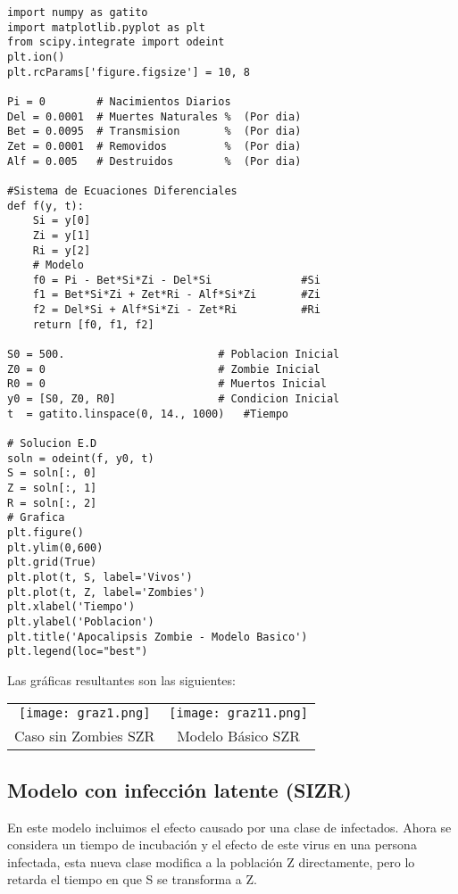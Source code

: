 \documentclass[12pt,letterpaper]{article}
\begin{document}
\begin{verbatim}
import numpy as gatito
import matplotlib.pyplot as plt
from scipy.integrate import odeint
plt.ion()
plt.rcParams['figure.figsize'] = 10, 8

Pi = 0        # Nacimientos Diarios
Del = 0.0001  # Muertes Naturales %  (Por dia)
Bet = 0.0095  # Transmision       %  (Por dia)
Zet = 0.0001  # Removidos         %  (Por dia)
Alf = 0.005   # Destruidos        %  (Por dia)

#Sistema de Ecuaciones Diferenciales 
def f(y, t):
    Si = y[0]
    Zi = y[1]
    Ri = y[2]
    # Modelo 
    f0 = Pi - Bet*Si*Zi - Del*Si              #Si
    f1 = Bet*Si*Zi + Zet*Ri - Alf*Si*Zi       #Zi 
    f2 = Del*Si + Alf*Si*Zi - Zet*Ri          #Ri
    return [f0, f1, f2]

S0 = 500.                        # Poblacion Inicial
Z0 = 0                           # Zombie Inicial
R0 = 0                           # Muertos Inicial
y0 = [S0, Z0, R0]                # Condicion Inicial
t  = gatito.linspace(0, 14., 1000)   #Tiempo

# Solucion E.D
soln = odeint(f, y0, t)
S = soln[:, 0]
Z = soln[:, 1]
R = soln[:, 2]
# Grafica
plt.figure()
plt.ylim(0,600)
plt.grid(True)
plt.plot(t, S, label='Vivos')
plt.plot(t, Z, label='Zombies')
plt.xlabel('Tiempo')
plt.ylabel('Poblacion')
plt.title('Apocalipsis Zombie - Modelo Basico')
plt.legend(loc="best")
\end{verbatim}

Las gr\'aficas resultantes son las siguientes:

\begin{center}

\begin{tabular}{c c}
\texttt{[image: graz1.png]} & \texttt{[image: graz11.png]}\\
Caso sin Zombies SZR & Modelo B\'asico SZR
\end{tabular}

\end{center}

\subsection*{Modelo con infecci\'on latente (SIZR)}
En este modelo incluimos el efecto causado por una clase de infectados. Ahora se considera un tiempo de incubaci\'on y el efecto de este virus en una persona infectada, esta nueva clase modifica a la poblaci\'on Z directamente, pero lo retarda el tiempo en que S se transforma a Z. 
\end{document}
